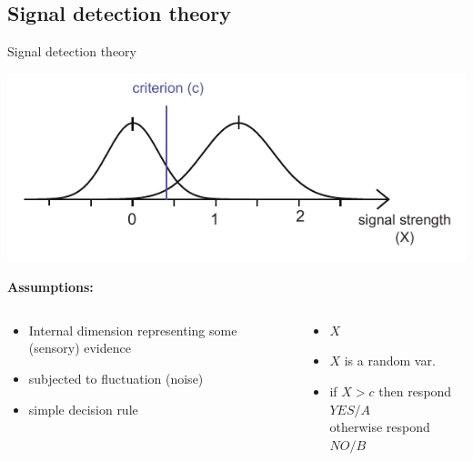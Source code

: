 \documentclass[10pt]{beamer}
\begin{document}
\subsection{Signal detection theory}
\begin{frame}{Signal detection theory}

\begin{center}
\includegraphics[scale=0.9]{figs/normaldist.pdf}
\end{center}

\textbf{Assumptions:}
\begin{columns}
\begin{column}{0.5\textwidth}
\begin{itemize}
\item Internal dimension representing some (sensory) evidence
\item subjected to fluctuation (noise) 
\item simple decision rule 
\end{itemize}
\end{column}
\begin{column}{0.5\textwidth}
\begin{itemize}
\item  $X$
\item $X$ is a random var.
\item if $X > c$ then respond $YES/A$\\
otherwise respond $NO/B$
\end{itemize}
\end{column}
\end{columns}
\end{frame}

\end{document}
